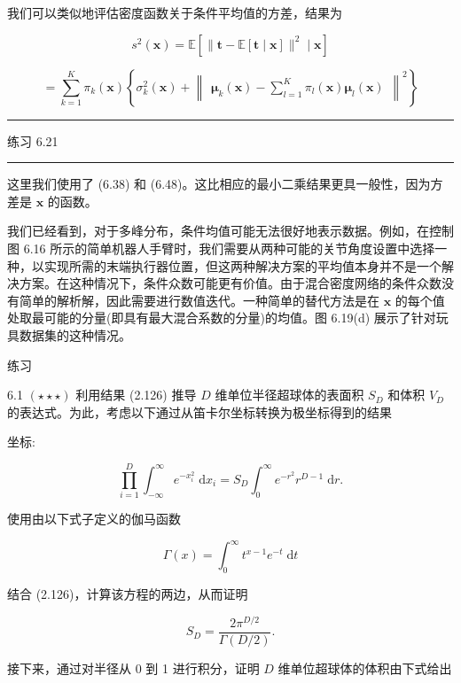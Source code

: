 \documentclass[10pt]{report}
\newcommand{\HRule}{\begin{center}\rule{0.9\linewidth}{0.2mm}\end{center}}
\begin{document}
我们可以类似地评估密度函数关于条件平均值的方差，结果为

\[
{s}^{2}\left( \mathbf{x}\right)  = \mathbb{E}\left\lbrack  {\parallel \mathbf{t} - \mathbb{E}\left\lbrack  {\mathbf{t} \mid  \mathbf{x}}\right\rbrack  {\parallel }^{2} \mid  \mathbf{x}}\right\rbrack   \tag{6.49}
\]

\[
= \mathop{\sum }\limits_{{k = 1}}^{K}{\pi }_{k}\left( \mathbf{x}\right) \left\{  {{\sigma }_{k}^{2}\left( \mathbf{x}\right)  + {\begin{Vmatrix}{\mathbf{\mu }}_{k}\left( \mathbf{x}\right)  - \mathop{\sum }\limits_{{l = 1}}^{K}{\pi }_{l}\left( \mathbf{x}\right) {\mathbf{\mu }}_{l}\left( \mathbf{x}\right) \end{Vmatrix}}^{2}}\right\}   \tag{6.50}
\]

\HRule

练习 6.21

\HRule

这里我们使用了 (6.38) 和 (6.48)。这比相应的最小二乘结果更具一般性，因为方差是 \(\mathbf{x}\) 的函数。

我们已经看到，对于多峰分布，条件均值可能无法很好地表示数据。例如，在控制图 6.16 所示的简单机器人手臂时，我们需要从两种可能的关节角度设置中选择一种，以实现所需的末端执行器位置，但这两种解决方案的平均值本身并不是一个解决方案。在这种情况下，条件众数可能更有价值。由于混合密度网络的条件众数没有简单的解析解，因此需要进行数值迭代。一种简单的替代方法是在 \(\mathbf{x}\) 的每个值处取最可能的分量(即具有最大混合系数的分量)的均值。图 6.19(d) 展示了针对玩具数据集的这种情况。

练习

6.1 \(\left( {\star  \star   \star  }\right)\) 利用结果 (2.126) 推导 \(D\) 维单位半径超球体的表面积 \({S}_{D}\) 和体积 \({V}_{D}\) 的表达式。为此，考虑以下通过从笛卡尔坐标转换为极坐标得到的结果

坐标:

\[
\mathop{\prod }\limits_{{i = 1}}^{D}{\int }_{-\infty }^{\infty }{e}^{-{x}_{i}^{2}}\mathrm{\;d}{x}_{i} = {S}_{D}{\int }_{0}^{\infty }{e}^{-{r}^{2}}{r}^{D - 1}\mathrm{\;d}r. \tag{6.51}
\]

使用由以下式子定义的伽马函数

\[
\Gamma \left( x\right)  = {\int }_{0}^{\infty }{t}^{x - 1}{e}^{-t}\mathrm{\;d}t \tag{6.52}
\]

结合 (2.126)，计算该方程的两边，从而证明

\[
{S}_{D} = \frac{2{\pi }^{D/2}}{\Gamma \left( {D/2}\right) }. \tag{6.53}
\]

接下来，通过对半径从 0 到 1 进行积分，证明 \(D\) 维单位超球体的体积由下式给出
\end{document}
